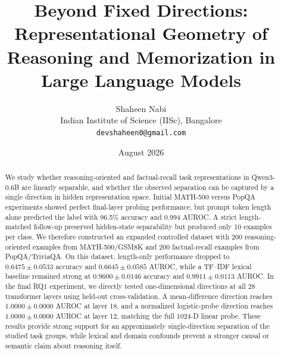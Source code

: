\documentclass[11pt]{article}
\title{
\textbf{
Beyond Fixed Directions:\\
Representational Geometry of Reasoning and Memorization in Large Language Models
}
}
\author{
Shaheen Nabi\\
Indian Institute of Science (IISc), Bangalore\\
\texttt{devshaheen0@gmail.com}
}
\date{August 2026}
\begin{document}
\maketitle

\begingroup
\renewcommand\thefootnote{}
\endgroup



\begin{abstract}

We study whether reasoning-oriented and factual-recall task representations in Qwen3-0.6B are linearly separable, and whether the observed separation can be captured by a single direction in hidden representation space. Initial MATH-500 versus PopQA experiments showed perfect final-layer probing performance, but prompt token length alone predicted the label with 96.5\% accuracy and 0.994 AUROC. A strict length-matched follow-up preserved hidden-state separability but produced only 10 examples per class. We therefore constructed an expanded controlled dataset with 200 reasoning-oriented examples from MATH-500/GSM8K and 200 factual-recall examples from PopQA/TriviaQA. On this dataset, length-only performance dropped to \(0.6475 \pm 0.0533\) accuracy and \(0.6645 \pm 0.0585\) AUROC, while a TF--IDF lexical baseline remained strong at \(0.9600 \pm 0.0146\) accuracy and \(0.9911 \pm 0.0113\) AUROC. In the final RQ1 experiment, we directly tested one-dimensional directions at all 28 transformer layers using held-out cross-validation. A mean-difference direction reaches \(1.0000 \pm 0.0000\) AUROC at layer 18, and a normalized logistic-probe direction reaches \(1.0000 \pm 0.0000\) AUROC at layer 12, matching the full 1024-D linear probe. These results provide strong support for an approximately single-direction separation of the studied task groups, while lexical and domain confounds prevent a stronger causal or semantic claim about reasoning itself.

\end{abstract}
\end{document}
